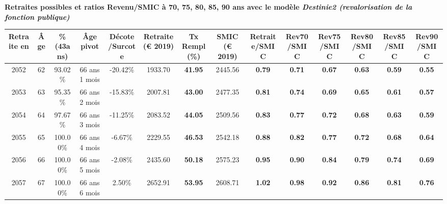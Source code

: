  \vspace{0.1cm} 
{\bf \noindent Retraites possibles et ratios Revenu/SMIC à 70, 75, 80, 85, 90 ans avec le modèle \emph{Destinie2 (revalorisation de la fonction publique)}}  
 
\begin{adjustbox}{max width=\textwidth} 
\begin{tabular}[htb]{|c|c||c|c|c||c|c||c||c|c|c|c|c|c|} 
\hline 
 Retraite en &  Âge &  \%(43ans) &  Âge pivot &  Décote/Surcote &  Retraite (\euro{} 2019) &  Tx Rempl(\%) &  SMIC (\euro{} 2019) &  Retraite/SMIC &  Rev70/SMIC &  Rev75/SMIC &  Rev80/SMIC &  Rev85/SMIC &  Rev90/SMIC \\ 
\hline \hline 
 2052 &  62 &  93.02\% &  66 ans 1 mois &  -20.42\% &  1933.70 &  {\bf 41.95} &  2445.56 &  {\bf {\color{red} 0.79}} &  {\bf {\color{red} 0.71}} &  {\bf {\color{red} 0.67}} &  {\bf {\color{red} 0.63}} &  {\bf {\color{red} 0.59}} &  {\bf {\color{red} 0.55}} \\ 
\hline 
 2053 &  63 &  95.35\% &  66 ans 2 mois &  -15.83\% &  2007.81 &  {\bf 43.00} &  2477.35 &  {\bf {\color{red} 0.81}} &  {\bf {\color{red} 0.74}} &  {\bf {\color{red} 0.69}} &  {\bf {\color{red} 0.65}} &  {\bf {\color{red} 0.61}} &  {\bf {\color{red} 0.57}} \\ 
\hline 
 2054 &  64 &  97.67\% &  66 ans 3 mois &  -11.25\% &  2083.52 &  {\bf 44.05} &  2509.56 &  {\bf {\color{red} 0.83}} &  {\bf {\color{red} 0.77}} &  {\bf {\color{red} 0.72}} &  {\bf {\color{red} 0.68}} &  {\bf {\color{red} 0.63}} &  {\bf {\color{red} 0.59}} \\ 
\hline 
 2055 &  65 &  100.00\% &  66 ans 4 mois &  -6.67\% &  2229.55 &  {\bf 46.53} &  2542.18 &  {\bf {\color{red} 0.88}} &  {\bf {\color{red} 0.82}} &  {\bf {\color{red} 0.77}} &  {\bf {\color{red} 0.72}} &  {\bf {\color{red} 0.68}} &  {\bf {\color{red} 0.64}} \\ 
\hline 
 2056 &  66 &  100.00\% &  66 ans 5 mois &  -2.08\% &  2435.60 &  {\bf 50.18} &  2575.23 &  {\bf {\color{red} 0.95}} &  {\bf {\color{red} 0.90}} &  {\bf {\color{red} 0.84}} &  {\bf {\color{red} 0.79}} &  {\bf {\color{red} 0.74}} &  {\bf {\color{red} 0.69}} \\ 
\hline 
 2057 &  67 &  100.00\% &  66 ans 6 mois &  2.50\% &  2652.91 &  {\bf 53.95} &  2608.71 &  {\bf 1.02} &  {\bf {\color{red} 0.98}} &  {\bf {\color{red} 0.92}} &  {\bf {\color{red} 0.86}} &  {\bf {\color{red} 0.81}} &  {\bf {\color{red} 0.76}} \\ 
\hline 
\hline 
\end{tabular} 
\end{adjustbox} 
 
